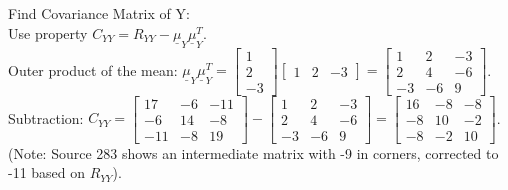 \documentclass[12pt]{article}
\begin{document}
\noindent
Find Covariance Matrix of Y: \\
Use property $C_{YY} = R_{YY} - \underline{\mu}_{Y}\underline{\mu}_{Y}^{T}$. \\
Outer product of the mean: $\underline{\mu}_{Y}\underline{\mu}_{Y}^{T} = \begin{bmatrix} 1 \\ 2 \\ -3 \end{bmatrix} \begin{bmatrix} 1 & 2 & -3 \end{bmatrix} = \begin{bmatrix} 1 & 2 & -3 \\ 2 & 4 & -6 \\ -3 & -6 & 9 \end{bmatrix}$. \\
Subtraction: $C_{YY} = \begin{bmatrix} 17 & -6 & -11 \\ -6 & 14 & -8 \\ -11 & -8 & 19 \end{bmatrix} - \begin{bmatrix} 1 & 2 & -3 \\ 2 & 4 & -6 \\ -3 & -6 & 9 \end{bmatrix} = \begin{bmatrix} 16 & -8 & -8 \\ -8 & 10 & -2 \\ -8 & -2 & 10 \end{bmatrix}$. (Note: Source 283 shows an intermediate matrix with -9 in corners, corrected to -11 based on $R_{YY}$).
\end{document}
